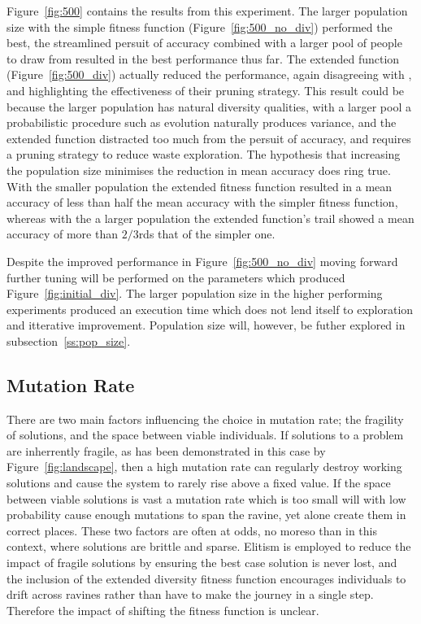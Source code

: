Figure~\ref{fig:500} contains the results from this experiment. The larger
population size with the simple fitness function (Figure~\ref{fig:500_no_div})
performed the best, the
streamlined persuit of accuracy combined with a larger pool of people to
draw from resulted in the best performance thus far.  The extended function
(Figure~\ref{fig:500_div})
actually reduced the performance, again disagreeing with
\cite{deJong:2001:RBP:2955239.2955241}, and highlighting the
effectiveness of their pruning strategy. This result could be because
the larger population has natural diversity qualities, with a larger pool
a probabilistic procedure such as evolution naturally produces variance,
and the extended
function distracted too much from the persuit of accuracy, and requires a pruning
strategy to reduce waste exploration. The hypothesis
that increasing the population size minimises the reduction in mean accuracy
does ring true. With the smaller population the extended fitness function resulted in
a mean accuracy of less than half the mean accuracy with the simpler fitness function,
whereas
with the a larger population the extended function's trail showed a mean accuracy of
more than
$2/3$rds that of the simpler one.

Despite the improved performance in Figure~\ref{fig:500_no_div} moving forward
further tuning will be performed on the parameters which produced
Figure~\ref{fig:initial_div}. The larger population size in the higher performing experiments
produced an execution time which does not lend itself to exploration and
itterative improvement. Population size will, however, be futher explored in
subsection~\ref{ss:pop_size}.

\subsection{Mutation Rate}

There are two main factors influencing the choice in mutation rate; the fragility
of solutions, and the space between viable individuals. If solutions to a problem are
inherrently fragile, as has been demonstrated in this case by Figure~\ref{fig:landscape},
then a high
mutation rate can regularly destroy working solutions and cause the system to
rarely rise above a fixed value. If the space between viable solutions is vast
a mutation rate which is too small will with low probability cause enough mutations to
span the ravine, yet alone create them in correct places. These two factors are
often at odds, no moreso than in this context, where solutions are brittle and
sparse. Elitism is employed to reduce the impact of fragile solutions by ensuring
the best case solution is never lost, and the inclusion of the extended diversity
fitness function encourages individuals to drift across ravines rather than have
to make the journey in a single step. Therefore the impact of shifting the
fitness function is unclear.


